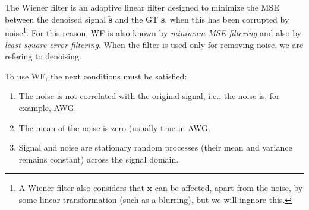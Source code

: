 \chapter{}

The Wiener filter \cite{wiener1942extrapolation} is an adaptive linear
filter designed to minimize the MSE between the denoised signal
$\tilde{\mathbf{s}}$ and the \gls{GT} $\mathbf{s}$, when this has been
corrupted by noise\footnote{A Wiener filter also considers that
  $\mathbf{x}$ can be affected, apart from the noise, by some linear
  transformation (such as a blurring), but we will ingnore this.}. For
this reason, \gls{WF} is also known by \emph{minimum \gls{MSE} filtering} and also
by \emph{least square error filtering}. When the filter is used only
for removing noise, we are refering to denoising.

To use \gls{WF}, the next conditions must be satisfied:
\begin{enumerate}
\item The noise is not correlated with the original signal, i.e., the
  noise is, for example, \gls{AWG}.
\item The mean of the noise is zero (usually true in \gls{AWG}.
\item Signal and noise are stationary random processes (their mean and
  variance remains constant) across the signal domain.
\end{enumerate}

